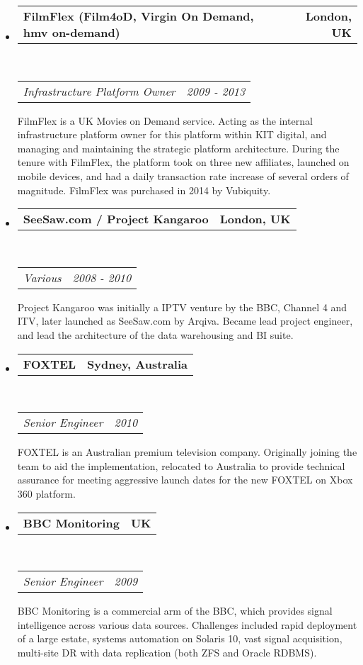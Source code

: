 \documentclass[10pt,a4paper]{article}
\makeatletter
\newcommand{\headerrow}[2]
{\begin{tabular*}{\linewidth}{l@{\extracolsep{\fill}}r}
    #1 &
    #2 \\
\end{tabular*}}
\makeatother
\begin{document}
\begin{itemize}
\begin{itemize}
            \item 
            \headerrow
                {\textbf{FilmFlex (Film4oD, Virgin On Demand, hmv on-demand)}}
                {\textbf{London, UK}}
            \\
            \headerrow
                {\emph{Infrastructure Platform Owner}}
                {\emph{2009 - 2013}}
                FilmFlex is a UK Movies on Demand service. Acting as the internal infrastructure platform owner for this platform within KIT digital, and managing and maintaining the strategic platform architecture. During the tenure with FilmFlex, the platform took on three new affiliates, launched on mobile devices, and had a daily transaction rate increase of several orders of magnitude. FilmFlex was purchased in 2014 by Vubiquity.
            \item 
            \headerrow
                {\textbf{SeeSaw.com / Project Kangaroo}}
                {\textbf{London, UK}}
            \\
            \headerrow
                {\emph{Various}}
                {\emph{2008 - 2010}}
                Project Kangaroo was initially a IPTV venture by the BBC, Channel 4 and ITV, later launched as SeeSaw.com by Arqiva. Became lead project engineer, and lead the architecture of the data warehousing and BI suite.
            \item 
            \headerrow
                {\textbf{FOXTEL}}
                {\textbf{Sydney, Australia}}
            \\
            \headerrow
                {\emph{Senior Engineer}}
                {\emph{2010}}
                FOXTEL is an Australian premium television company. Originally joining the team to aid the implementation, relocated to Australia to provide technical assurance for meeting aggressive launch dates for the new FOXTEL on Xbox 360 platform.
            \item 
            \headerrow
                {\textbf{BBC Monitoring}}
                {\textbf{UK}}
            \\
            \headerrow
                {\emph{Senior Engineer}}
                {\emph{2009}}
                BBC Monitoring is a commercial arm of the BBC, which provides signal intelligence across various data sources. Challenges included rapid deployment of a large estate, systems automation on Solaris 10, vast signal acquisition, multi-site DR with data replication (both ZFS and Oracle RDBMS).
        \end{itemize}


\end{itemize}
\end{document}

